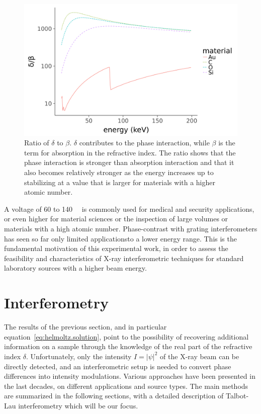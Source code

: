 \begin{figure}[htb]
    \centering
    \includegraphics[width=\textwidth]{gfx/delta-beta-comparison/delta-beta-comparison.png}
    \caption[Values of $\delta/\beta$ as a function of energy for different
    materials.]{Ratio of $\delta$ to $\beta$. $\delta$ contributes to the
    phase interaction, while $\beta$ is the term for absorption in the
refractive index. The ratio shows that the phase interaction is stronger
than absorption interaction and that it also becomes relatively stronger as
the energy increases up to stabilizing at a value that is larger for
materials with a higher atomic number.}
    \label{fig:delta.beta}
\end{figure}

A voltage of 60 to \SI{140}{\kilo\voltpeak} is commonly used for medical and
security applications, or even higher for material sciences or the
inspection of large volumes or materials with a high atomic number.
Phase-contrast with grating interferometers has seen so far only limited
applications\cn to a lower energy range.
This is the fundamental motivation of this experimental work, in order to
assess the feasibility and characteristics of X-ray interferometric
techniques for standard laboratory sources with a higher beam energy.

\section{Interferometry}

The results of the previous section, and in particular
equation~\eqref{eq:helmoltz.solution}, point to the possibility of recovering
additional information on a sample through the knowledge of the real part of
the refractive index $\delta$. Unfortunately, only the intensity $I =
|\psi|^2$ of the X-ray beam can be directly detected, and an interferometric
setup is needed to convert phase differences into intensity modulations.
Various approaches have been presented in the last decades, on different
applications and source types. The main methods are summarized in the
following sections, with a detailed description of Talbot-Lau interferometry
which will be our focus.

